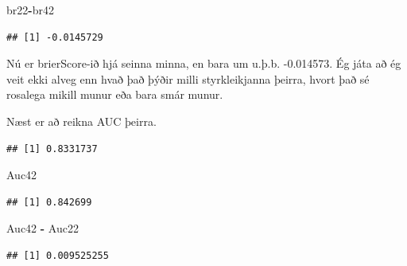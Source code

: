 \documentclass[
]{article}
\newenvironment{Shaded}{\begin{snugshade}}{\end{snugshade}}
\newcommand{\DataTypeTok}[1]{\textcolor[rgb]{0.13,0.29,0.53}{#1}}
\newcommand{\KeywordTok}[1]{\textcolor[rgb]{0.13,0.29,0.53}{\textbf{#1}}}
\newcommand{\NormalTok}[1]{#1}
\newcommand{\OperatorTok}[1]{\textcolor[rgb]{0.81,0.36,0.00}{\textbf{#1}}}
\newcommand{\StringTok}[1]{\textcolor[rgb]{0.31,0.60,0.02}{#1}}
\begin{document}
\begin{Shaded}
\begin{Highlighting}[]
\NormalTok{br22}\OperatorTok{-}\NormalTok{br42}
\end{Highlighting}
\end{Shaded}

\begin{verbatim}
## [1] -0.0145729
\end{verbatim}

Nú er brierScore-ið hjá seinna minna, en bara um u.þ.b. -0.014573. Ég játa að ég veit ekki alveg enn hvað það þýðir milli styrkleikjanna þeirra, hvort það sé rosalega mikill munur eða bara smár munur.

Næst er að reikna AUC þeirra.

\begin{Shaded}
\end{Shaded}

\begin{verbatim}
## [1] 0.8331737
\end{verbatim}

\begin{Shaded}
\begin{Highlighting}[]
\NormalTok{Auc42}
\end{Highlighting}
\end{Shaded}

\begin{verbatim}
## [1] 0.842699
\end{verbatim}

\begin{Shaded}
\begin{Highlighting}[]
\NormalTok{Auc42 }\OperatorTok{-}\StringTok{ }\NormalTok{Auc22}
\end{Highlighting}
\end{Shaded}

\begin{verbatim}
## [1] 0.009525255
\end{verbatim}
\end{document}
